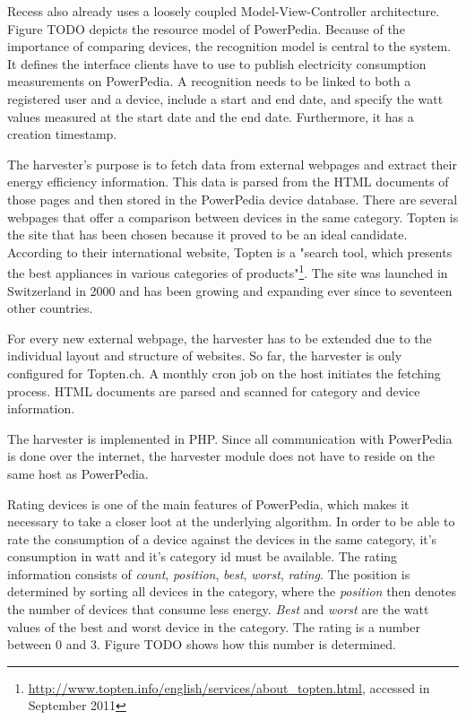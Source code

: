 
Recess also already uses a loosely coupled Model-View-Controller architecture.
Figure TODO depicts the resource model of PowerPedia. Because of the importance of comparing devices, the recognition model is central to the system. It defines the interface clients have to use to publish electricity consumption measurements on PowerPedia. A recognition needs to be linked to both a registered user and a device, include a start and end date, and specify the watt values measured at the start date and the end date. Furthermore, it has a creation timestamp.

The harvester's purpose is to fetch data from external webpages and extract their energy efficiency information. This data is parsed from the HTML documents of those pages and then stored in the PowerPedia device database.
There are several webpages that offer a comparison between devices in the same category. Topten is the site that has been chosen because it proved to be an ideal candidate. According to their international website, Topten is a "search tool, which presents the best appliances in various categories of products"\footnote{\url{http://www.topten.info/english/services/about_topten.html}, accessed in September 2011}. The site was launched in Switzerland in 2000 and has been growing and expanding ever since to seventeen other countries. 

For every new external webpage, the harvester has to be extended due to the individual layout and structure of websites. So far, the harvester is only configured for Topten.ch. A monthly cron job on the host initiates the fetching process. HTML documents are parsed and scanned for category and device information. 

The harvester is implemented in PHP. Since all communication with PowerPedia is done over the internet, the harvester module does not have to reside on the same host as PowerPedia. 


Rating devices is one of the main features of PowerPedia, which makes it necessary to take a closer loot at the underlying algorithm.
In order to be able to rate the consumption of a device against the devices in the same category, it's consumption in watt and it's category id must be available. 
The rating information consists of \textit{count}, \textit{position}, \textit{best}, \textit{worst}, \textit{rating}. The position is determined by sorting all devices in the category, where the \textit{position} then denotes the number of devices that consume less energy. \textit{Best} and \textit{worst} are the watt values of the best and worst device in the category. The rating is a number between 0 and 3. Figure TODO shows how this number is determined.
 
